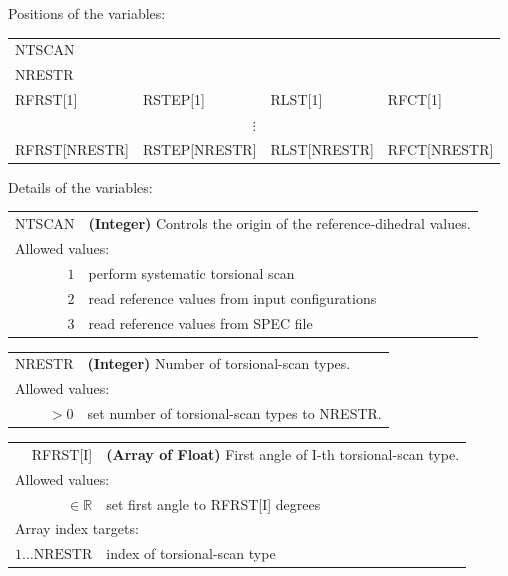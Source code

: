 \documentclass[10pt,a4paper,openany]{memoir}
\numberwithin{equation}{section}
\begin{document}
Positions of the variables:
\begin{center}
  \begin{tabular}{llll}
    NTSCAN &      &      &      \\
    NRESTR &      &      &      \\
    RFRST[1] & RSTEP[1] & RLST[1] & RFCT[1] \\
    \multicolumn{4}{c}{$\vdots$} \\
    RFRST[NRESTR] & RSTEP[NRESTR] & RLST[NRESTR] & RFCT[NRESTR] \\
  \end{tabular}
\end{center}

\noindent Details of the variables:
\vspace{2ex}

{
\begin{tabular}{r@{ : }l}
\label{descr:rfrst}
     NTSCAN&\textbf{(Integer)} Controls the origin of the reference-dihedral values.                \\ 
\multicolumn{2}{l}{Allowed values:} \\ 
\(1\)& perform systematic torsional scan\\ 
\(2\)& read reference values from input configurations\\ 
\(3\)& read reference values from SPEC file\\ 
\end{tabular}
\vspace{1ex}
}

{
\begin{tabular}{r@{ : }l}
\label{descr:rfrst}
     NRESTR&\textbf{(Integer)} Number of torsional-scan types.                \\ 
\multicolumn{2}{l}{Allowed values:} \\ 
\(>0\)& set number of torsional-scan types to NRESTR.\\ 
\end{tabular}
\vspace{1ex}
}


{
\begin{tabular}{r@{ : }l}
\label{descr:rfrst}
     RFRST[I]&\textbf{(Array of Float)} First angle of I-th torsional-scan type.                                                                \\ 
\multicolumn{2}{l}{Allowed values:} \\ 
\(\in\mathbb{R}\)&set first angle to RFRST[I] degrees                                                                  \\ 
\multicolumn{2}{l}{Array index targets:} \\ 
\(1\ldots \text{NRESTR} \)& index of torsional-scan type \\
\end{tabular}
\vspace{1ex}
}
\end{document}
